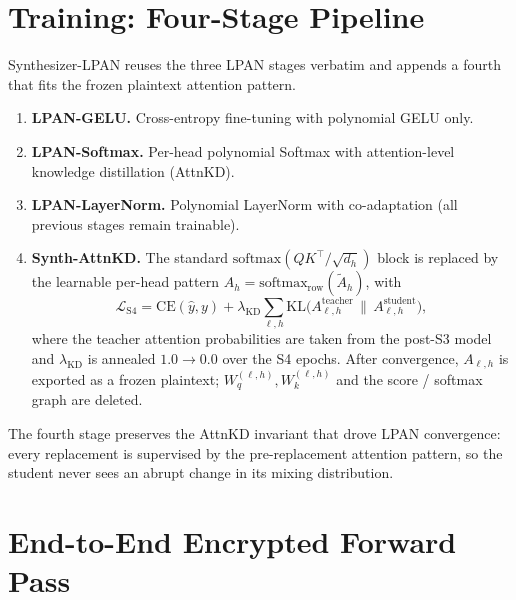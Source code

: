 \documentclass[11pt,a4paper]{article}
\newcommand{\softmax}{\mathrm{softmax}}
\begin{document}
\section{Training: Four-Stage Pipeline}
\label{sec:training}

Synthesizer-LPAN reuses the three LPAN stages verbatim and appends a
fourth that fits the frozen plaintext attention pattern.

\begin{enumerate}[leftmargin=2em]
  \item[\textbf{S1.}] \textbf{LPAN-GELU.}
      Cross-entropy fine-tuning with polynomial GELU only.
  \item[\textbf{S2.}] \textbf{LPAN-Softmax.}
      Per-head polynomial Softmax with attention-level knowledge
      distillation (AttnKD).
  \item[\textbf{S3.}] \textbf{LPAN-LayerNorm.}
      Polynomial LayerNorm with co-adaptation
      (all previous stages remain trainable).
  \item[\textbf{S4.}] \textbf{Synth-AttnKD.}
      The standard $\softmax(QK^\top/\sqrt{d_h})$ block is replaced by
      the learnable per-head pattern
      $A_h = \softmax_{\text{row}}(\tilde A_h)$, with
      \begin{equation}
      \mathcal{L}_{\mathrm{S4}} =
      \mathrm{CE}(\hat y, y) +
      \lambda_{\mathrm{KD}} \sum_{\ell, h}
      \mathrm{KL}\bigl(A_{\ell,h}^{\mathrm{teacher}}
                       \,\|\, A_{\ell,h}^{\mathrm{student}}\bigr),
      \label{eq:s4_loss}
      \end{equation}
      where the teacher attention probabilities are taken from the
      post-S3 model and $\lambda_{\mathrm{KD}}$ is annealed
      $1.0 \to 0.0$ over the S4 epochs.  After convergence,
      $A_{\ell,h}$ is exported as a frozen plaintext;
      $W_q^{(\ell,h)}, W_k^{(\ell,h)}$ and the score / softmax graph are
      deleted.
\end{enumerate}

\noindent The fourth stage preserves the AttnKD invariant that drove
LPAN convergence: every replacement is supervised by the
pre-replacement attention pattern, so the student never sees an abrupt
change in its mixing distribution.

\section{End-to-End Encrypted Forward Pass}
\end{document}
